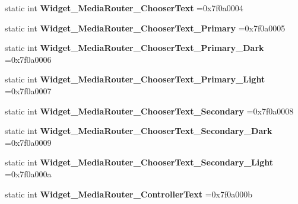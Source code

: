 \begin{DoxyCompactItemize}
static int {\bfseries Widget\+\_\+\+Media\+Router\+\_\+\+Chooser\+Text} =0x7f0a0004
\item 
\mbox{\label{classandroid_1_1support_1_1v4_1_1R_1_1style_a372851fd6839a109b5f4322edf0af718}} 
static int {\bfseries Widget\+\_\+\+Media\+Router\+\_\+\+Chooser\+Text\+\_\+\+Primary} =0x7f0a0005
\item 
\mbox{\label{classandroid_1_1support_1_1v4_1_1R_1_1style_a29f0888135e4af2a9e5cfd721b6bcb49}} 
static int {\bfseries Widget\+\_\+\+Media\+Router\+\_\+\+Chooser\+Text\+\_\+\+Primary\+\_\+\+Dark} =0x7f0a0006
\item 
\mbox{\label{classandroid_1_1support_1_1v4_1_1R_1_1style_a3abea93da46efb50c8dc03c2329895f6}} 
static int {\bfseries Widget\+\_\+\+Media\+Router\+\_\+\+Chooser\+Text\+\_\+\+Primary\+\_\+\+Light} =0x7f0a0007
\item 
\mbox{\label{classandroid_1_1support_1_1v4_1_1R_1_1style_aa2ee5c2c51bcf02f622d264e7f411230}} 
static int {\bfseries Widget\+\_\+\+Media\+Router\+\_\+\+Chooser\+Text\+\_\+\+Secondary} =0x7f0a0008
\item 
\mbox{\label{classandroid_1_1support_1_1v4_1_1R_1_1style_a44aa21a91654db603015ed8137122470}} 
static int {\bfseries Widget\+\_\+\+Media\+Router\+\_\+\+Chooser\+Text\+\_\+\+Secondary\+\_\+\+Dark} =0x7f0a0009
\item 
\mbox{\label{classandroid_1_1support_1_1v4_1_1R_1_1style_a62a467033ecc246065b5a76dfa58143d}} 
static int {\bfseries Widget\+\_\+\+Media\+Router\+\_\+\+Chooser\+Text\+\_\+\+Secondary\+\_\+\+Light} =0x7f0a000a
\item 
\mbox{\label{classandroid_1_1support_1_1v4_1_1R_1_1style_aea0889bd020f53aa90f46287805caa33}} 
static int {\bfseries Widget\+\_\+\+Media\+Router\+\_\+\+Controller\+Text} =0x7f0a000b
\item 
\mbox{\label{classandroid_1_1support_1_1v4_1_1R_1_1style_a4511c4e72ddb59a3a1450030e14292d3}} 

\end{DoxyCompactItemize}
